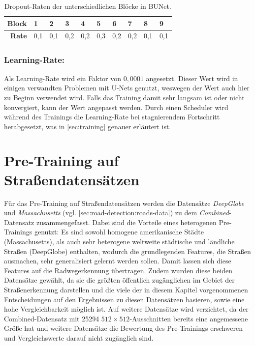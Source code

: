 \begin{table}[ht]
	\centering
	\begin{tabular}{r|ll|ll|l|ll|ll}
		\textbf{Block} & 1 & 2 & 3 & 4 & 5  & 6 & 7 & 8 & 9 \\
		\midrule
		\textbf{Rate} & 0,1 & 0,1 & 0,2 & 0,2 & 0,3 & 0,2 & 0,2 & 0,1 & 0,1 \\ 
	\end{tabular}
	\caption{Dropout-Raten der unterschiedlichen Blöcke in \ac{BUNet}.}
	\label{tab:dropout}
\end{table}

\subsubsection{Learning-Rate:}

Als Learning-Rate wird ein Faktor von $0,0001$ angesetzt. Dieser Wert wird in einigen verwandten Problemen mit U-Nets genutzt, 
weswegen der Wert auch hier zu Beginn verwendet wird. Falls das Training damit sehr langsam ist oder nicht konvergiert, 
kann der Wert angepasst werden. Durch einen Scheduler wird während des Trainings die Learning-Rate bei stagnierendem Fortschritt 
herabgesetzt, was in \autoref{sec:training} genauer erläutert ist. 

\section{Pre-Training auf Straßendatensätzen} \label{sec:pre-training-roads}

Für das Pre-Training auf Straßendatensätzen werden die Datensätze \textit{DeepGlobe} und \textit{Massachusetts} 
(vgl. \autoref{sec:road-detection:roads-data}) zu dem \textit{Combined}-Datensatz zusammengefasst. 
Dabei sind die Vorteile eines heterogenen Pre-Trainings genutzt: Es sind sowohl homogene amerikanische Städte (Massachusetts), 
als auch sehr heterogene weltweite städtische und ländliche Straßen (DeepGlobe) enthalten, wodurch 
die grundlegenden Features, die Straßen ausmachen, sehr generalisiert gelernt werden sollen. Damit lassen sich diese 
Features auf die Radwegerkennung übertragen. Zudem wurden diese beiden Datensätze gewählt, da sie die größten öffentlich zugänglichen 
im Gebiet der Straßenerkennung darstellen und die viele der in diesem Kapitel vorgenommenen Entscheidungen 
auf den Ergebnissen zu diesen Datensätzen basieren, sowie eine hohe Vergleichbarkeit möglich ist. 
Auf weitere Datensätze wird verzichtet, da der Combined-Datensatz mit 25294 $512 \times 512$-Ausschnitten 
bereits eine angemessene Größe hat und weitere Datensätze die Bewertung des Pre-Trainings erschweren und Vergleichswerte 
darauf nicht zugänglich sind. 

